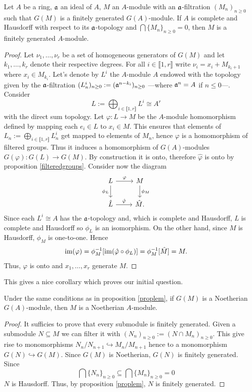 \begin{prop}\label{proplem}
    Let $A$ be a ring, $\mathfrak{a}$ an ideal of $A$, $M$ an $A$-module with an $\mathfrak{a}$-filtration $(M_n)_{n\geq0}$ such that $G(M)$ is a finitely generated $G(A)$-module. If $A$ is complete and Hausdorff with respect to its $\mathfrak{a}$-topology and $\bigcap \{M_n\}_{n\geq 0}=0$, then $M$ is a finitely generated $A$-module.
\end{prop}
\begin{proof}
    Let $\nu_1,\dots,\nu_r$ be a set of homogeneous generators of $G(M)$ and let $k_1,\dots, k_r$ denote their respective degrees. For all $i\in\llbracket 1,r\rrbracket$ write $\nu_i=x_i+M_{k_i+1}$ where $x_i\in M_{k_i}$. Let's denote by $L^i$ the $A$-module $A$ endowed with the topology given by the $\mathfrak{a}$-filtration $(L_n^i)_{n\geq 0}:=(\mathfrak{a}^{n-k_i})_{n\geq 0}$ ---where $\mathfrak{a}^n=A$ if $n\leq 0$---. Consider
    \[
    L:= \bigoplus_{i\in\llbracket 1,r\rrbracket}L^i\cong A^r
    \]
    with the direct sum topology. Let $\varphi\colon L\to M$ be the $A$-module homomorphism defined by mapping each $e_i\in L$ to $x_i\in M$. This ensures that elements of $L_n:=\bigoplus_{i\in\llbracket 1,r\rrbracket}L^i_n$ get mapped to elements of $M_n$, hence $\varphi$ is a homomorphism of filtered groups. Thus it induces a homomorphism of $G(A)$-modules $G(\varphi)\colon G(L)\to G(M)$. By construction it is onto, therefore $\hat \varphi$ is onto by proposition \ref{filteredgroups}. Consider now the diagram
    \[
    \begin{tikzcd}
        L \ar[r, "\varphi"] \ar[d, "\phi_L"'] & M \ar[d, "\phi_M"] \\
        \hat L \ar[r, "\hat\varphi"] & \hat M.
    \end{tikzcd}
    \]
    Since each $L^i\cong A$ has the $\mathfrak{a}$-topology and, which is complete and Hausdorff, $L$ is complete and Hausdorff so $\phi_L$ is an isomorphism. On the other hand, since $M$ is Hausdorff, $\phi_M$ is one-to-one. Hence
    \[
    \operatorname{im}(\varphi)=\phi_M^{-1}[\operatorname{im}(\hat\varphi\circ\phi_L)]=\phi_M^{-1}[\hat M]=M.
    \]
    Thus, $\varphi$ is onto and $x_1,\dots,x_r$ generate $M$.
\end{proof}

This gives a nice corollary which proves our initial question.
\begin{coro}
    Under the same conditions as in proposition \ref{proplem}, if $G(M)$ is a Noetherian $G(A)$-module, then $M$ is a Noetherian $A$-module.
\end{coro}
\begin{proof}
    It sufficies to prove that every submodule is finitely generated. Given a submodule $N\subseteq M$ we can filter it with $(N_n)_{n\geq 0}:=(N\cap M_n)_{n\geq 0}$. This give rise to monomorphisms $N_n/N_{n+1}\hookrightarrow M_n/M_{n+1}$ hence to a monomorphism $G(N)\hookrightarrow G(M)$. Since $G(M)$ is Noetherian, $G(N)$ is finitely generated. Since 
    \[
    \bigcap\{N_n\}_{n\geq 0}\subseteq \bigcap\{M_n\}_{n\geq 0}=0
    \]
    $N$ is Hausdorff. Thus, by proposition \ref{proplem}, $N$ is finitely generated.
\end{proof}

